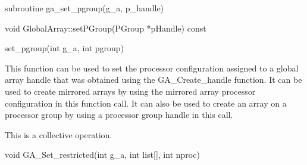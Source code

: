 \documentclass[12pt]{article}
\begin{document}
\begin{fapi}
\begin{fcode}
subroutine ga_set_pgroup(g_a, p_handle)
\end{fcode}
\begin{funcargs}
\end{funcargs}
\end{fapi}

\begin{cxxapi}
\begin{cxxcode}
void GlobalArray::setPGroup(PGroup *pHandle) const
\end{cxxcode}
\begin{funcargs}
\end{funcargs}
\end{cxxapi}

\begin{pyapi}
\begin{pycode}
set_pgroup(int g_a, int pgroup)
\end{pycode}
\end{pyapi}
\gcoll

\begin{desc}

  This function can be used to set the processor configuration
  assigned to a global array handle that was obtained using the
  GA_Create_handle function. It can be used to create mirrored arrays
  by using the mirrored array processor configuration in this function
  call. It can also be used to create an array on a processor group by
  using a processor group handle in this call.

  This is a collective operation.

\end{desc}


\begin{capi}
\begin{ccode}
void GA_Set_restricted(int g_a, int list[], int nproc)
\end{ccode}
\begin{funcargs}
\end{funcargs}
\end{capi}
\end{document}
